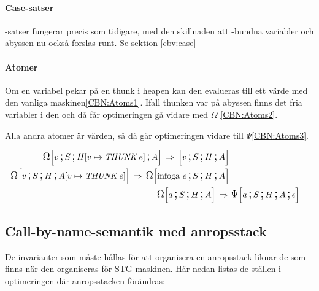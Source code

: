 \documentclass[../Optimise]{subfiles}
\begin{document}
\paragraph{Case-satser}
-satser fungerar precis som tidigare, med den skillnaden att -bundna variabler 
och abyssen nu också forslas runt. Se sektion \ref{cbv:case}

\paragraph{Atomer}
Om en variabel pekar på en thunk i heapen kan den evalueras till ett
värde med den vanliga maskinen\eqref{CBN:Atoms1}. Ifall thunken var på abyssen
finns det fria variabler i den och då får optimeringen gå vidare med $\Omega$ \eqref{CBN:Atoms2}.

Alla andra atomer är värden, så då går optimeringen vidare till $\Psi$\eqref{CBN:Atoms3}.

\begin{align}
\label{CBN:Atoms1}\CBNOMEGA S{\heap v{\THUNK e}}Av \rulesep \CBNMC vSHA\\
\label{CBN:Atoms2}\CBNOMEGA SH{\abyss v{\THUNK e}}v  \rulesep \CBNOMEGA SHA{\text{infoga }e}\\
\label{CBN:Atoms3}\CBNOMEGA SHAa \rulesep &\, \CBNPSI SHA{\epsilon}a
\end{align}


\subsection{Call-by-name-semantik med anropsstack}
\label{sec:CBN:Callstack}


De invarianter som måste hållas för att organisera en anropsstack liknar de som finns
när den organiseras för STG-maskinen. Här nedan listas de ställen i optimeringen där anropsstacken förändras:
\end{document}
